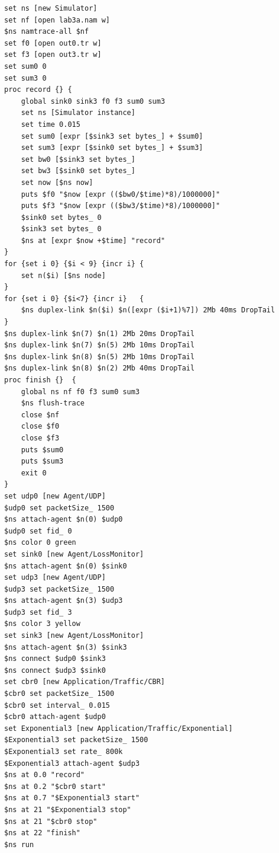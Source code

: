 \documentclass{article}%
\begin{document}
\begin{itemize}
\begin{verbatim}
set ns [new Simulator]
set nf [open lab3a.nam w]
$ns namtrace-all $nf
set f0 [open out0.tr w]
set f3 [open out3.tr w]
set sum0 0
set sum3 0
proc record {} {
	global sink0 sink3 f0 f3 sum0 sum3
	set ns [Simulator instance]
	set time 0.015
	set sum0 [expr [$sink3 set bytes_] + $sum0]
	set sum3 [expr [$sink0 set bytes_] + $sum3]
	set bw0 [$sink3 set bytes_]
	set bw3 [$sink0 set bytes_]
	set now [$ns now]
	puts $f0 "$now [expr (($bw0/$time)*8)/1000000]"
	puts $f3 "$now [expr (($bw3/$time)*8)/1000000]"
	$sink0 set bytes_ 0
	$sink3 set bytes_ 0
	$ns at [expr $now +$time] "record"
}
for {set i 0} {$i < 9} {incr i}	{
	set n($i) [$ns node]
} 	
for {set i 0} {$i<7} {incr i}	{
	$ns duplex-link $n($i) $n([expr ($i+1)%7]) 2Mb 40ms DropTail
}
$ns duplex-link $n(7) $n(1) 2Mb 20ms DropTail
$ns duplex-link $n(7) $n(5) 2Mb 10ms DropTail
$ns duplex-link $n(8) $n(5) 2Mb 10ms DropTail
$ns duplex-link $n(8) $n(2) 2Mb 40ms DropTail
proc finish	{}	{
	global ns nf f0 f3 sum0 sum3
	$ns flush-trace
	close $nf
	close $f0
	close $f3
	puts $sum0
	puts $sum3
	exit 0
}
set udp0 [new Agent/UDP]
$udp0 set packetSize_ 1500
$ns attach-agent $n(0) $udp0
$udp0 set fid_ 0
$ns color 0 green
set sink0 [new Agent/LossMonitor]
$ns attach-agent $n(0) $sink0
set udp3 [new Agent/UDP]
$udp3 set packetSize_ 1500
$ns attach-agent $n(3) $udp3
$udp3 set fid_ 3
$ns color 3 yellow
set sink3 [new Agent/LossMonitor]
$ns attach-agent $n(3) $sink3
$ns connect $udp0 $sink3
$ns connect $udp3 $sink0
set cbr0 [new Application/Traffic/CBR]
$cbr0 set packetSize_ 1500
$cbr0 set interval_ 0.015
$cbr0 attach-agent $udp0
set Exponential3 [new Application/Traffic/Exponential]
$Exponential3 set packetSize_ 1500
$Exponential3 set rate_ 800k
$Exponential3 attach-agent $udp3
$ns at 0.0 "record"
$ns at 0.2 "$cbr0 start"
$ns at 0.7 "$Exponential3 start"
$ns at 21 "$Exponential3 stop"
$ns at 21 "$cbr0 stop"
$ns at 22 "finish"
$ns run


\end{verbatim} 
	
	
\end{itemize}
\end{document}
